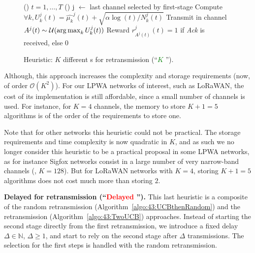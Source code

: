 \begin{figure}[h!]
	\centering
\begin{framed}
	\begin{algorithm}[H]
		\For()
		{$t = 1, \dots, T$}{
			\Else(){ %
				j $\leftarrow$ last channel selected by first-stage \UCB\;
				Compute $\forall k, U_k^j(t) = \widehat{\mu_k}^j(t) + \sqrt{\alpha \log(t) / N_k^j(t)}$\;
				Transmit in channel $A^j(t) \sim \mathcal{U}(\operatorname*{arg\,max}_k U^j_k(t))$\;
				Reward $r^j_{A^j(t)}(t) = 1$ if \emph{Ack} is received, else $0$\;
			}
		}
		\caption[Heuristic: $K$ different {\UCB}s for retransmission.]{Heuristic: $K$ different {\UCB}s for retransmission (``\textcolor{green}{$K$ \UCB}'').}
		\label{algo:43:UCBthenKp1}
	\end{algorithm}
	\end{framed}
\end{figure}

Although, this approach increases the complexity and storage requirements (now, of order $\mathcal{O}(K^2)$).
For our LPWA networks of interest, such as LoRaWAN, the cost of its implementation is still affordable, since a small number of channels is used.
For instance, for $K=4$ channels,
the memory to store $K+1=5$ algorithms is of the order of the requirements to store one.

Note that for other networks this heuristic could not be practical.
The storage requirements and time complexity is now quadratic in $K$, and as such we no longer consider this heuristic to be a practical proposal in some LPWA networks, as for instance Sigfox networks consist in a large number of very narrow-band channels (\eg, $K=128$).
But for LoRaWAN networks with $K=4$, storing $K+1=5$ algorithms does not cost much more than storing $2$.


\textbf{Delayed \UCB{} for retransmission (``\textcolor{red}{Delayed \UCB}'').}\label{sub:43:UCBwithDelay}
%
This last heuristic is a composite of
the random retransmission (Algorithm~\ref{algo:43:UCBthenRandom})
and the \UCB{} retransmission (Algorithm~\ref{algo:43:TwoUCB}) approaches.
Instead of starting the second stage \UCB{} directly from the first retransmission, we introduce a fixed delay $\Delta\in\mathbb{N}$, $\Delta \geq 1$,
and start to rely on the second stage \UCB{} after $\Delta$ transmissions.
The selection for the first steps is handled with the random retransmission.

